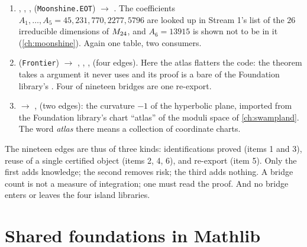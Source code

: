 \begin{enumerate}[leftmargin=*,itemsep=2pt]
  .
\item {}, , ,
   (\texttt{Moonshine.EOT}) $\to$ . The
  coefficients $A_1,\dots,A_5=45,231,770,2277,5796$ are looked up in Stream 1's list of
  the $26$ irreducible dimensions of $M_{24}$, and $A_6=13915$ is shown not to be in it
  (\cref{ch:moonshine}). Again one table, two consumers.
\item {} (\texttt{Frontier}) $\to$
  , , ,
   (four edges). Here the atlas flatters the code: the theorem takes a
   argument it never uses and its proof is a bare  of the
  Foundation library's 
  . Four of nineteen bridges are one
  re-export.
\item {} $\to$ ,
   (two edges): the curvature $-1$ of the hyperbolic plane,
  imported from the Foundation library's chart ``atlas'' of the moduli space of
  \cref{ch:swampland}. The word \emph{atlas} there means a collection of coordinate charts.
\end{enumerate}
The nineteen edges are thus of three kinds: identifications proved (items 1 and 3),
reuse of a single certified object (items 2, 4, 6), and re-export (item 5). Only the
first adds knowledge; the second removes risk; the third adds nothing. A bridge count is
not a measure of integration; one must read the proof. And no bridge enters or leaves
the four island libraries.

\section{Shared foundations in Mathlib}\label{sec:atlas:shared}

